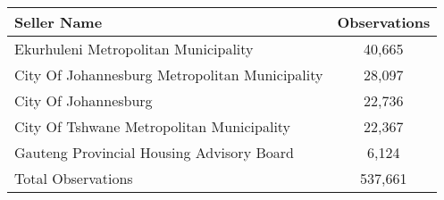 \begin{tabu}{lc}
\toprule
 Seller Name & Observations \\
\midrule
Ekurhuleni Metropolitan Municipality & 40,665  \\
City Of Johannesburg Metropolitan Municipality & 28,097  \\
City Of Johannesburg & 22,736  \\
City Of Tshwane Metropolitan Municipality & 22,367  \\
Gauteng Provincial Housing Advisory Board & 6,124  \\
\midrule
Total Observations & 537,661  \\
\bottomrule
\end{tabu}

